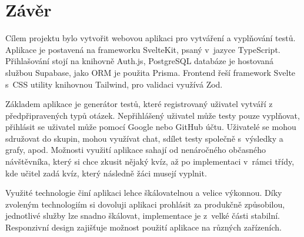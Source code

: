 \documentclass[12pt, a4paper,
openright
]{report}
\let\oldchapter\chapter
\renewcommand{\chapter}{
	\clearpage
	\pagestyle{fancy}
	\oldchapter
}
\begin{document}


\chapter{Závěr}
	
Cílem projektu bylo vytvořit webovou aplikaci pro vytváření a vyplňování testů. Aplikace je postavená na frameworku SvelteKit, psaný v~jazyce TypeScript. Přihlašování stojí na knihovně Auth.js, PostgreSQL databáze je hostovaná službou Supabase, jako ORM je použita Prisma. Frontend řeší framework Svelte s~CSS utility knihovnou Tailwind, pro validaci využívá Zod.

Základem aplikace je generátor testů, které registrovaný uživatel vytváří z předpřipravených typů otázek. Nepřihlášený uživatel může testy pouze vyplňovat, přihlásit se uživatel může pomocí Google nebo GitHub účtu. Uživatelé se mohou sdružovat do skupin, mohou využívat chat, sdílet testy společně s~výsledky a grafy, apod. Možnosti využití aplikace sahají od nenáročného občasného návštěvníka, který si chce zkusit nějaký kvíz, až po implementaci v~rámci třídy, kde učitel zadá kvíz, který následně žáci musejí vyplnit.

Využité technologie činí aplikaci lehce škálovatelnou a velice výkonnou. Díky zvoleným technologiím si dovoluji aplikaci prohlásit za produkčně způsobilou, jednotlivé služby lze snadno škálovat, implementace je z~velké části stabilní. Responzivní design zajišťuje možnost použití aplikace na různých zařízeních.
\end{document}
